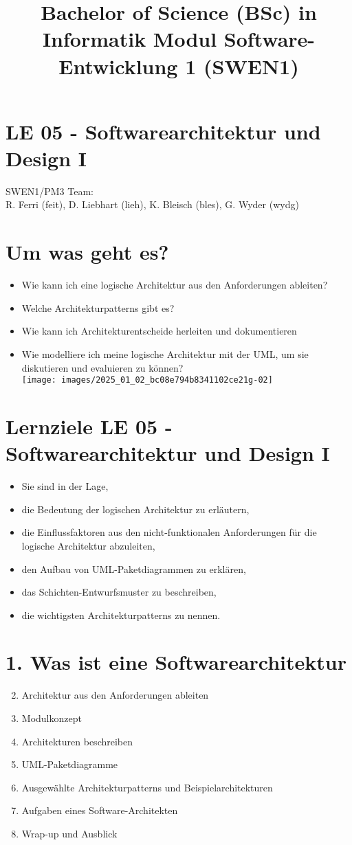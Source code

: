 \documentclass[10pt]{article}
\title{Bachelor of Science (BSc) in Informatik Modul Software-Entwicklung 1 (SWEN1) }
\author{}
\date{}
\begin{document}
\maketitle
\section*{LE 05 - Softwarearchitektur und Design I}
SWEN1/PM3 Team:\\
R. Ferri (feit), D. Liebhart (lieh), K. Bleisch (bles), G. Wyder (wydg)

\section*{Um was geht es?}
\begin{itemize}
  \item Wie kann ich eine logische Architektur aus den Anforderungen ableiten?
  \item Welche Architekturpatterns gibt es?
  \item Wie kann ich Architekturentscheide herleiten und dokumentieren
  \item Wie modelliere ich meine logische Architektur mit der UML, um sie diskutieren und evaluieren zu können?\\
\texttt{[image: images/2025\_01\_02\_bc08e794b8341102ce21g-02]}
\end{itemize}

\section*{Lernziele LE 05 - Softwarearchitektur und Design I}
\begin{itemize}
  \item Sie sind in der Lage,
  \item die Bedeutung der logischen Architektur zu erläutern,
  \item die Einflussfaktoren aus den nicht-funktionalen Anforderungen für die logische Architektur abzuleiten,
  \item den Aufbau von UML-Paketdiagrammen zu erklären,
  \item das Schichten-Entwurfsmuster zu beschreiben,
  \item die wichtigsten Architekturpatterns zu nennen.
\end{itemize}

\section*{1. Was ist eine Softwarearchitektur}
\begin{enumerate}
  \setcounter{enumi}{1}
  \item Architektur aus den Anforderungen ableiten
  \item Modulkonzept
  \item Architekturen beschreiben
  \item UML-Paketdiagramme
  \item Ausgewählte Architekturpatterns und Beispielarchitekturen
  \item Aufgaben eines Software-Architekten
  \item Wrap-up und Ausblick
\end{enumerate}
\end{document}
